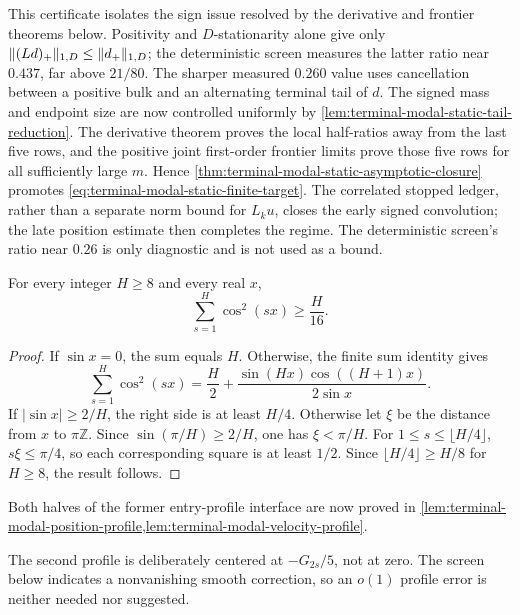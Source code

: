 This certificate isolates the sign issue resolved by the derivative and
frontier theorems below.  Positivity and
$D$-stationarity alone give only
$\lVert(Ld)_+\rVert_{1,D}\le\lVert d_+\rVert_{1,D}$; the deterministic screen measures
the latter ratio near $0.437$, far above $21/80$.  The sharper measured
$0.260$ value uses cancellation between a positive bulk and an alternating
terminal tail of $d$.  The signed mass and endpoint size are now controlled
uniformly by \cref{lem:terminal-modal-static-tail-reduction}.  The derivative
theorem proves the local half-ratios away from the last five rows, and the
positive joint first-order frontier limits prove those five rows for all
sufficiently large $m$.  Hence
\cref{thm:terminal-modal-static-asymptotic-closure} promotes
\eqref{eq:terminal-modal-static-finite-target}.  The correlated stopped
ledger, rather than a separate norm bound for $L_k u$, closes the early
signed convolution; the late position estimate then completes the regime.
The deterministic screen's ratio near $0.26$ is only diagnostic and is not
used as a bound.

\begin{lemma}
\label{lem:terminal-modal-cosine-square}
For every integer $H\ge8$ and every real $x$,
\begin{equation}
 \sum_{s=1}^{H}\cos^2(sx)\ge\frac{H}{16}.
 \label{eq:terminal-modal-cosine-square}
\end{equation}
\end{lemma}

\begin{proof}
If $\sin x=0$, the sum equals $H$.  Otherwise, the finite sum identity gives
\[
 \sum_{s=1}^H\cos^2(sx)
 =\frac H2+\frac{\sin(Hx)\cos((H+1)x)}{2\sin x}.
\]
If $|\sin x|\ge2/H$, the right side is at least $H/4$.  Otherwise let
$\xi$ be the distance from $x$ to $\pi\mathbb Z$.  Since
$\sin(\pi/H)\ge2/H$, one has $\xi<\pi/H$.  For
$1\le s\le\lfloor H/4\rfloor$, $s\xi\le\pi/4$, so each corresponding
square is at least $1/2$.  Since
$\lfloor H/4\rfloor\ge H/8$ for $H\ge8$, the result follows.
\end{proof}

Both halves of the former entry-profile interface are now proved in
\cref{lem:terminal-modal-position-profile,lem:terminal-modal-velocity-profile}.

The second profile is deliberately centered at $-G_{2s}/5$, not at zero.
The screen below indicates a nonvanishing smooth correction, so an $o(1)$
profile error is neither needed nor suggested.

